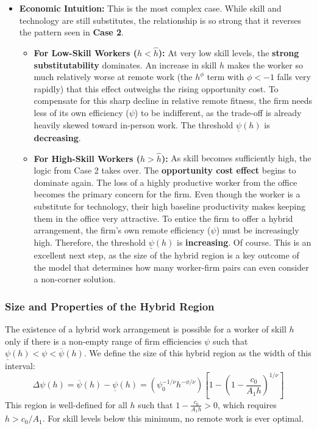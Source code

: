 \documentclass[
  11pt,
  letterpaper,
  DIV=11,
  numbers=noendperiod]{scrartcl}
\providecommand{\tightlist}{%
  \setlength{\itemsep}{0pt}\setlength{\parskip}{0pt}}\usepackage{longtable,booktabs,array}
\begin{document}
\begin{itemize}
\tightlist
\item
  \textbf{Economic Intuition:} This is the most complex case. While
  skill and technology are still substitutes, the relationship is so
  strong that it reverses the pattern seen in \textbf{Case 2}.

  \begin{itemize}
  \tightlist
  \item
    \textbf{For Low-Skill Workers (\(h < \hat{h}\)):} At very low skill
    levels, the \textbf{strong substitutability} dominates. An increase
    in skill \(h\) makes the worker so much relatively worse at remote
    work (the \(h^\phi\) term with \(\phi < -1\) falls very rapidly)
    that this effect outweighs the rising opportunity cost. To
    compensate for this sharp decline in relative remote fitness, the
    firm needs less of its own efficiency (\(\psi\)) to be indifferent,
    as the trade-off is already heavily skewed toward in-person work.
    The threshold \(\underline{\psi}(h)\) is \textbf{decreasing}.
  \item
    \textbf{For High-Skill Workers (\(h > \hat{h}\)):} As skill becomes
    sufficiently high, the logic from Case 2 takes over. The
    \textbf{opportunity cost effect} begins to dominate again. The loss
    of a highly productive worker from the office becomes the primary
    concern for the firm. Even though the worker is a substitute for
    technology, their high baseline productivity makes keeping them in
    the office very attractive. To entice the firm to offer a hybrid
    arrangement, the firm's own remote efficiency (\(\psi\)) must be
    increasingly high. Therefore, the threshold \(\underline{\psi}(h)\)
    is \textbf{increasing}. Of course. This is an excellent next step,
    as the size of the hybrid region is a key outcome of the model that
    determines how many worker-firm pairs can even consider a non-corner
    solution.
  \end{itemize}
\end{itemize}

\subsubsection{\texorpdfstring{\textbf{Size and Properties of the Hybrid
Region}}{Size and Properties of the Hybrid Region}}\label{size-and-properties-of-the-hybrid-region}

The existence of a hybrid work arrangement is possible for a worker of
skill \(h\) only if there is a non-empty range of firm efficiencies
\(\psi\) such that \(\underline{\psi}(h) < \psi < \overline{\psi}(h)\).
We define the size of this hybrid region as the width of this interval:
\[
\Delta\psi(h) = \overline{\psi}(h) - \underline{\psi}(h) = \left( \psi_0^{-1/\nu} h^{-\phi/\nu} \right) \left[ 1 - \left( 1 - \frac{c_0}{A_1 h} \right)^{1/\nu} \right]
\] This region is well-defined for all \(h\) such that
\(1 - \frac{c_0}{A_1 h} > 0\), which requires \(h > c_0/A_1\). For skill
levels below this minimum, no remote work is ever optimal.
\end{document}

